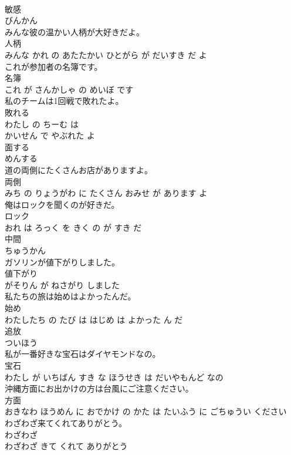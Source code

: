 \documentclass[8pt]{extreport}
\begin{document}
\begin{CJK}{UTF8}{min}
\\	敏感	
\\	びんかん		
\\	みんな彼の温かい人柄が大好きだよ。	
\\	人柄 
\\	みんな かれ の あたたかい ひとがら が だいすき だ よ			
\\	これが参加者の名簿です。	
\\	名簿 
\\	これ が さんかしゃ の めいぼ です			
\\	私のチームは1回戦で敗れたよ。	
\\	敗れる 
\\	わたし の ちーむ は 
\\	かいせん で やぶれた よ			
\\	面する	
\\	めんする		
\\	道の両側にたくさんお店がありますよ。	
\\	両側 
\\	みち の りょうがわ に たくさん おみせ が あります よ			
\\	俺はロックを聞くのが好きだ。	
\\	ロック 
\\	おれ は ろっく を きく の が すき だ			
\\	中間	
\\	ちゅうかん		
\\	ガソリンが値下がりしました。	
\\	値下がり 
\\	がそりん が ねさがり しました			
\\	私たちの旅は始めはよかったんだ。	
\\	始め 
\\	わたしたち の たび は はじめ は よかった ん だ			
\\	追放	
\\	ついほう		
\\	私が一番好きな宝石はダイヤモンドなの。	
\\	宝石 
\\	わたし が いちばん すき な ほうせき は だいやもんど なの			
\\	沖縄方面にお出かけの方は台風にご注意ください。	
\\	方面 
\\	おきなわ ほうめん に おでかけ の かた は たいふう に ごちゅうい ください			
\\	わざわざ来てくれてありがとう。	
\\	わざわざ 
\\	わざわざ きて くれて ありがとう			

\end{CJK}
\end{document}
